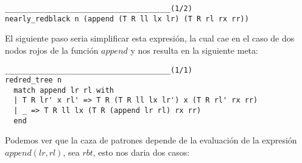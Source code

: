 \begin{verbatim}
______________________________________(1/2)
nearly_redblack n (append (T R ll lx lr) (T R rl rx rr))
\end{verbatim}

El siguiente paso seria simplificar esta expresión, la cual cae en el caso de dos nodos rojos de la 
función \hyperref[func_app]{$append$} y nos resulta en la siguiente meta:

\begin{verbatim}
______________________________________(1/1)
redred_tree n
  match append lr rl with
  | T R lr' x rl' => T R (T R ll lx lr') x (T R rl' rx rr)
  | _ => T R ll lx (T R (append lr rl) rx rr)
  end
\end{verbatim}

Podemos ver que la caza de patrones depende de la evaluaci\'on de la expresi\'on $append(lr,rl)$,
sea $rbt$, esto nos daria dos casos:

